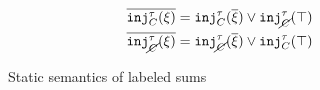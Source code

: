 \begin{figure}[ht]
  \begin{align*}
    \cdual{\cinj{C}{\tau}{\xi}}     & = \cinj{C}{\tau}{\cdual{\xi}} \vee \cinj{\notC}{\tau}{\ctruth} \\
    \cdual{\cinj{\notC}{\tau}{\xi}} & = \cinj{\notC}{\tau}{\cdual{\xi}} \vee \cinj{C}{\tau}{\ctruth}
  \end{align*}


  \begin{mathpar}

  \end{mathpar}


  \begin{mathpar}

  \end{mathpar}


  \begin{mathpar}

  \end{mathpar}

  \caption{Static semantics of labeled sums}
  \label{fig:labeled-sums-statics}
\end{figure}
